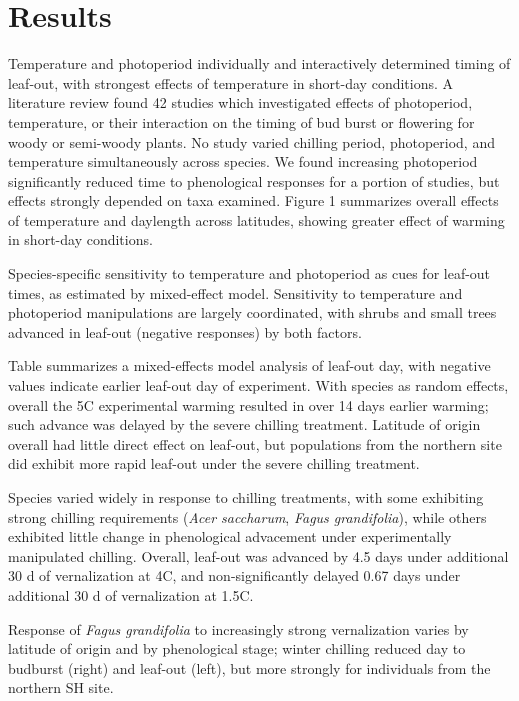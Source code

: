 \documentclass[11pt]{article}
\begin{document}
\section{Results}

Temperature and photoperiod individually and interactively determined timing of leaf-out, with strongest effects of temperature in short-day conditions. A literature review found 42 studies which investigated effects of photoperiod, temperature, or their interaction on the timing of bud burst or flowering for woody or semi-woody plants.  No study varied chilling period, photoperiod, and temperature simultaneously across species. We found increasing photoperiod significantly reduced time to phenological responses for a portion of studies, but effects strongly depended on taxa examined. Figure 1 summarizes overall effects of temperature and daylength across latitudes, showing greater effect of warming in short-day conditions.

Species-specific sensitivity to temperature and photoperiod as cues for leaf-out times, as estimated by mixed-effect model. Sensitivity to temperature and photoperiod manipulations are largely coordinated, with shrubs and small trees advanced in leaf-out (negative responses) by both factors.

Table  summarizes a mixed-effects model analysis of leaf-out day, with negative values indicate earlier leaf-out day of experiment. With species as random effects, overall the 5\degree C experimental warming resulted in over 14 days earlier warming; such advance was delayed by the severe chilling treatment. Latitude of origin overall had little direct effect on leaf-out, but populations from the northern site did exhibit more rapid leaf-out under the severe chilling treatment.

Species varied widely in response to chilling treatments, with some exhibiting strong chilling requirements (\emph{Acer saccharum}, \emph{Fagus grandifolia}), while others exhibited little change in phenological advacement under experimentally manipulated chilling. Overall, leaf-out was advanced by 4.5 days under additional 30 d of vernalization at 4\degree C, and non-significantly delayed 0.67 days under additional 30 d of vernalization at 1.5\degree C.

Response of \emph{Fagus grandifolia} to increasingly strong vernalization varies by latitude of origin and by phenological stage; winter chilling reduced day to budburst (right) and leaf-out (left), but more strongly for individuals from the northern SH site.
\end{document}
